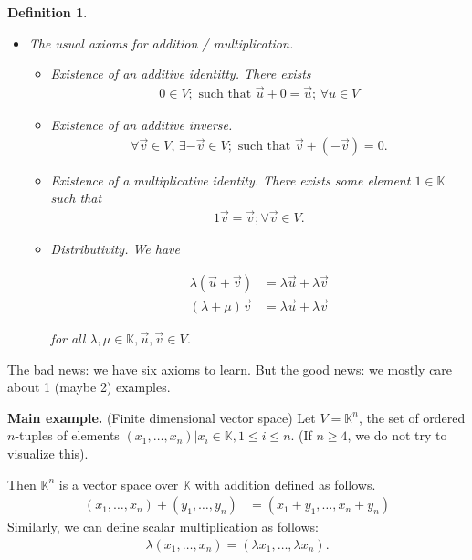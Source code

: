 \documentclass[12pt]{article}
\newtheorem*{definition}{Definition}
\def\KK{\mathbb{K}}
\def\lb{\lambda}
\begin{document}
\begin{definition}
\begin{itemize}
    \item The usual axioms for addition / multiplication.

      \begin{itemize}
        \item Existence of an additive identitty.
      There exists 
      \begin{align*}
        0 \in V; \text{ such that } \vec{u} + 0 = \vec{u}; \, \forall u \in V
      \end{align*}

    \item Existence of an additive inverse.
      \begin{align*}
        \forall \vec{v} \in V, \, \exists - \vec{v} \in V; \text{ such that } \vec{v} + (- \vec{v}) = 0.
      \end{align*}

    \item Existence of a multiplicative identity.  There exists some element $1 \in \KK$ such that
      \begin{align*}
        1 \vec{v} = \vec{v}; \forall \vec{v} \in V.
      \end{align*}

    \item Distributivity.  We have

      \begin{align*}
        \lb (\vec{u} + \vec{v}) &= \lb \vec{u} + \lb \vec{v} \\
        (\lb + \mu) \vec{v} &= \lb \vec{u} + \lb \vec{v}
      \end{align*}

      for all $\lb, \mu \in \KK, \vec{u}, \vec{v} \in V$.
        \end{itemize}
    \end{itemize}
\end{definition}

The bad news: we have six axioms to learn.  But the good news: we mostly care about 1 (maybe 2) examples.

{\bf Main example.} (Finite dimensional vector space) Let $V = \KK^n$, the set of ordered $n$-tuples of elements $(x_1, \dots, x_n) | x_i \in \KK, 1 \leq i \leq n$.  (If $n \geq 4$, we do not try to visualize this).

Then $\KK^n$ is a vector space over $\KK$ with addition defined as follows.
\begin{align*}
  (x_1, \dots, x_n) + (y_1, \dots, y_n) &= (x_1 + y_1, \dots, x_n + y_n)
\end{align*}
Similarly, we can define scalar multiplication as follows:
\begin{align*}
  \lb (x_1, \dots, x_n) = (\lb x_1, \dots, \lb x_n).
\end{align*}
\end{document}

